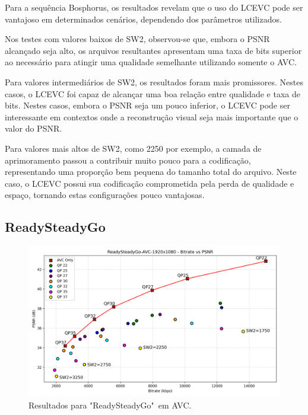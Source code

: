 Para a sequência Bosphorus, os resultados revelam que o uso do \acrshort{LCEVC} pode
ser vantajoso em determinados cenários, dependendo dos parâmetros utilizados.

Nos testes com valores baixos de SW2, observou-se que, embora o \acrshort{PSNR} 
alcançado seja alto, os arquivos resultantes apresentam uma taxa de bits
superior ao necessário para atingir uma qualidade semelhante utilizando
somente o \acrshort{AVC}. 

Para valores intermediários de SW2, os resultados foram mais promissores. Nestes
casos, o \acrshort{LCEVC} foi capaz de alcançar uma boa relação entre qualidade
e taxa de bits. Nestes casos, embora o \acrshort{PSNR} seja um pouco inferior,
o \acrshort{LCEVC} pode ser interessante em contextos onde a reconstrução visual
seja mais importante que o valor do \acrshort{PSNR}.

Para valores mais altos de SW2, como 2250 por exemplo, a camada de aprimoramento
passou a contribuir muito pouco para a codificação, representando uma proporção
bem pequena do tamanho total do arquivo. Neste caso, o \acrshort{LCEVC} possui
sua codificação comprometida pela perda de qualidade e espaço, tornando estas
configurações pouco vantajosas.

\subsection{ReadySteadyGo}

\begin{figure}[h]
    \centering
    \includegraphics[width=1.0\textwidth]{img/ReadySteadyGo-AVC.png}
    \caption{Resultados para "ReadySteadyGo"\ em \acrshort{AVC}. \cite{uvg_dataset}}
    \label{fig:RSG}
\end{figure}

